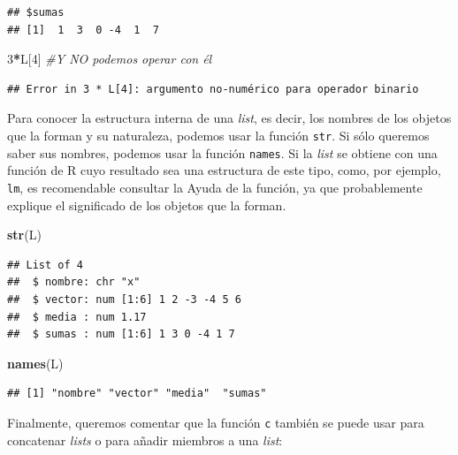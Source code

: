 \documentclass[]{book}
\newenvironment{Shaded}{\begin{snugshade}}{\end{snugshade}}
\newcommand{\CommentTok}[1]{\textcolor[rgb]{0.56,0.35,0.01}{\textit{#1}}}
\newcommand{\DecValTok}[1]{\textcolor[rgb]{0.00,0.00,0.81}{#1}}
\newcommand{\KeywordTok}[1]{\textcolor[rgb]{0.13,0.29,0.53}{\textbf{#1}}}
\newcommand{\NormalTok}[1]{#1}
\newcommand{\OperatorTok}[1]{\textcolor[rgb]{0.81,0.36,0.00}{\textbf{#1}}}
\theoremstyle{definition}
\theoremstyle{definition}
\theoremstyle{definition}
\theoremstyle{remark}
\begin{document}
\begin{verbatim}
## $sumas
## [1]  1  3  0 -4  1  7
\end{verbatim}

\begin{Shaded}
\begin{Highlighting}[]
\DecValTok{3}\OperatorTok{*}\NormalTok{L[}\DecValTok{4}\NormalTok{]   }\CommentTok{#Y NO podemos operar con él}
\end{Highlighting}
\end{Shaded}

\begin{verbatim}
## Error in 3 * L[4]: argumento no-numérico para operador binario
\end{verbatim}

Para conocer la estructura interna de una \emph{list}, es decir, los nombres de los objetos que la forman y su naturaleza, podemos usar la función \texttt{str}. Si sólo queremos saber sus nombres, podemos usar la función \texttt{names}. Si la \emph{list} se obtiene con una función de R cuyo resultado sea una estructura de este tipo, como, por ejemplo, \texttt{lm}, es recomendable consultar la Ayuda de la función, ya que probablemente explique el significado de los objetos que la forman.

\begin{Shaded}
\begin{Highlighting}[]
\KeywordTok{str}\NormalTok{(L)}
\end{Highlighting}
\end{Shaded}

\begin{verbatim}
## List of 4
##  $ nombre: chr "x"
##  $ vector: num [1:6] 1 2 -3 -4 5 6
##  $ media : num 1.17
##  $ sumas : num [1:6] 1 3 0 -4 1 7
\end{verbatim}

\begin{Shaded}
\begin{Highlighting}[]
\KeywordTok{names}\NormalTok{(L)}
\end{Highlighting}
\end{Shaded}

\begin{verbatim}
## [1] "nombre" "vector" "media"  "sumas"
\end{verbatim}

Finalmente, queremos comentar que la función \texttt{c} también se puede usar para concatenar \emph{lists} o para añadir miembros a una \emph{list}:
\end{document}
